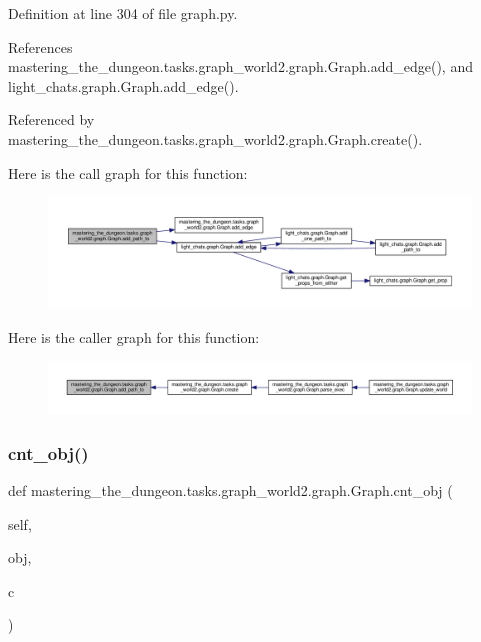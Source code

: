 Definition at line 304 of file graph.\+py.



References mastering\+\_\+the\+\_\+dungeon.\+tasks.\+graph\+\_\+world2.\+graph.\+Graph.\+add\+\_\+edge(), and light\+\_\+chats.\+graph.\+Graph.\+add\+\_\+edge().



Referenced by mastering\+\_\+the\+\_\+dungeon.\+tasks.\+graph\+\_\+world2.\+graph.\+Graph.\+create().

Here is the call graph for this function\+:
\nopagebreak
\begin{figure}[H]
\begin{center}
\leavevmode
\includegraphics[width=350pt]{classmastering__the__dungeon_1_1tasks_1_1graph__world2_1_1graph_1_1Graph_a1eda56c20f83b99104e941902d828b04_cgraph}
\end{center}
\end{figure}
Here is the caller graph for this function\+:
\nopagebreak
\begin{figure}[H]
\begin{center}
\leavevmode
\includegraphics[width=350pt]{classmastering__the__dungeon_1_1tasks_1_1graph__world2_1_1graph_1_1Graph_a1eda56c20f83b99104e941902d828b04_icgraph}
\end{center}
\end{figure}
\mbox{\label{classmastering__the__dungeon_1_1tasks_1_1graph__world2_1_1graph_1_1Graph_a02912f17088f70619bcab3a6e2435bed}} 
\subsubsection{\texorpdfstring{cnt\+\_\+obj()}{cnt\_obj()}}
{\footnotesize\ttfamily def mastering\+\_\+the\+\_\+dungeon.\+tasks.\+graph\+\_\+world2.\+graph.\+Graph.\+cnt\+\_\+obj (\begin{DoxyParamCaption}\item[{}]{self,  }\item[{}]{obj,  }\item[{}]{c }\end{DoxyParamCaption})}



